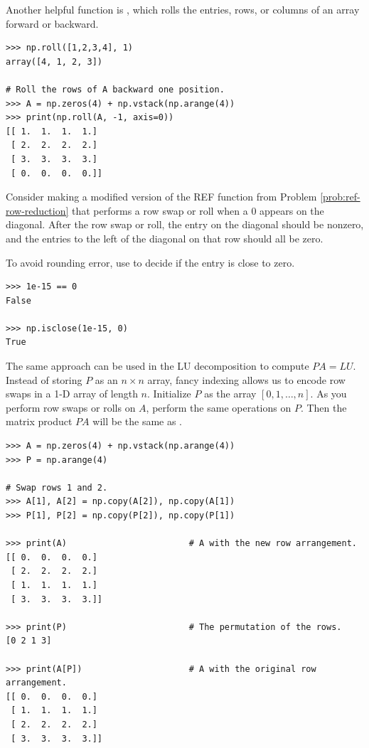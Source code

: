 Another helpful function is , which rolls the entries, rows, or columns of an array forward or backward.

\begin{lstlisting}
>>> np.roll([1,2,3,4], 1)
array([4, 1, 2, 3])

# Roll the rows of A backward one position.
>>> A = np.zeros(4) + np.vstack(np.arange(4))
>>> print(np.roll(A, -1, axis=0))
[[ 1.  1.  1.  1.]
 [ 2.  2.  2.  2.]
 [ 3.  3.  3.  3.]
 [ 0.  0.  0.  0.]]
\end{lstlisting}

Consider making a modified version of the REF function from Problem \ref{prob:ref-row-reduction} that performs a row swap or roll when a $0$ appears on the diagonal.
After the row swap or roll, the entry on the diagonal should be nonzero, and the entries to the left of the diagonal on that row should all be zero.

To avoid rounding error, use  to decide if the entry is close to zero.

\begin{lstlisting}
>>> 1e-15 == 0
False

>>> np.isclose(1e-15, 0)
True
\end{lstlisting}


The same approach can be used in the LU decomposition to compute $PA = LU$.
Instead of storing $P$ as an $n \times n$ array, fancy indexing allows us to encode row swaps in a 1-D array of length $n$.
Initialize $P$ as the array $[0, 1, \ldots, n]$.
As you perform row swaps or rolls on $A$, perform the same operations on $P$.
Then the matrix product $PA$ will be the same as .

\newpage

\begin{lstlisting}
>>> A = np.zeros(4) + np.vstack(np.arange(4))
>>> P = np.arange(4)

# Swap rows 1 and 2.
>>> A[1], A[2] = np.copy(A[2]), np.copy(A[1])
>>> P[1], P[2] = np.copy(P[2]), np.copy(P[1])

>>> print(A)                        # A with the new row arrangement.
[[ 0.  0.  0.  0.]
 [ 2.  2.  2.  2.]
 [ 1.  1.  1.  1.]
 [ 3.  3.  3.  3.]]

>>> print(P)                        # The permutation of the rows.
[0 2 1 3]

>>> print(A[P])                     # A with the original row arrangement.
[[ 0.  0.  0.  0.]
 [ 1.  1.  1.  1.]
 [ 2.  2.  2.  2.]
 [ 3.  3.  3.  3.]]
\end{lstlisting}

